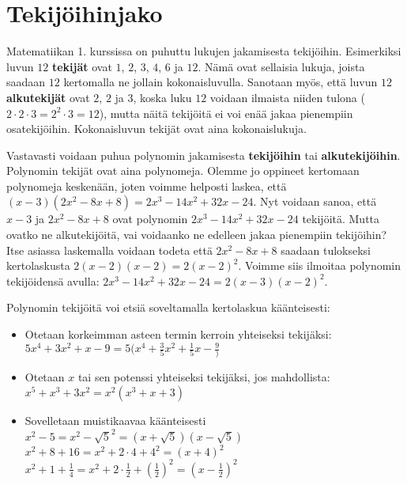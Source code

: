 
\section{Tekijöihinjako}

Matematiikan 1. kurssissa on puhuttu lukujen jakamisesta tekijöihin.
Esimerkiksi luvun $12$ {\bf tekijät} ovat $1$, $2$, $3$, $4$, $6$ ja $12$. Nämä ovat sellaisia
lukuja, joista saadaan $12$ kertomalla ne jollain kokonaisluvulla. Sanotaan myös, että luvun $12$
{\bf alkutekijät} ovat $2$, $2$ ja $3$, koska luku $12$ voidaan
ilmaista niiden tulona ($2\cdot 2\cdot 3 = 2^2\cdot 3 = 12$), mutta näitä tekijöitä ei
voi enää jakaa pienempiin osatekijöihin. Kokonaisluvun tekijät ovat aina kokonaislukuja.

Vastavasti voidaan puhua polynomin jakamisesta {\bf tekijöihin} tai {\bf alkutekijöihin}. Polynomin tekijät
ovat aina polynomeja. Olemme jo oppineet kertomaan polynomeja keskenään,
joten voimme helposti laskea, että $(x-3)(2x^2-8x+8)=2x^3-14x^2+32x-24$.
Nyt voidaan sanoa, että $x-3$ ja $2x^2-8x+8$ ovat polynomin $2x^3-14x^2+32x-24$ tekijöitä.
Mutta ovatko ne alkutekijöitä, vai voidaanko ne edelleen jakaa pienempiin tekijöihin?
Itse asiassa laskemalla voidaan todeta että $2x^2-8x+8$ saadaan tulokseksi kertolaskusta $2(x-2)(x-2)=2(x-2)^2$.
Voimme siis ilmoitaa polynomin tekijöidensä avulla: $2x^3-14x^2+32x-24=2(x-3)(x-2)^2$.

Polynomin tekijöitä voi etsiä soveltamalla kertolaskua käänteisesti:

\begin{itemize}
\item Otetaan korkeimman asteen termin kerroin yhteiseksi tekijäksi: \\
$5x^4+3x^2+x-9 = 5(x^4+\frac35 x^2+\frac15 x-\frac9)$
\item Otetaan $x$ tai sen potenssi yhteiseksi tekijäksi, jos mahdollista: \\
$x^5+x^3+3x^2 = x^2(x^3+x+3)$
\item Sovelletaan muistikaavaa käänteisesti \\
$x^2-5=x^2-\sqrt{5}^2=(x+\sqrt{5})(x-\sqrt{5})$ \\
$x^2+8+16=x^2+2\cdot 4+4^2=(x+4)^2$ \\
$x^2+1+\frac14=x^2+2\cdot \frac12+(\frac12)^2=(x-\frac12)^2$
\end{itemize}

